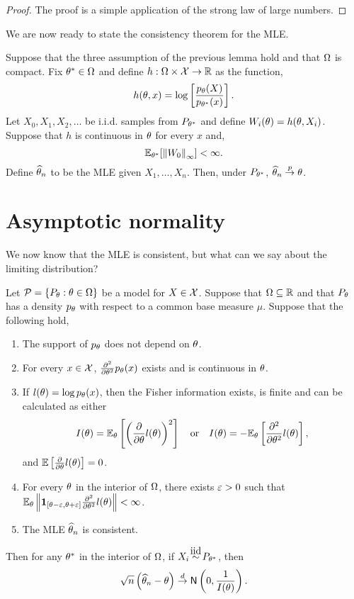 \begin{proof}
    The proof is a simple application of the strong law of large numbers.
\end{proof}
We are now ready to state the consistency theorem for the MLE. 
\begin{theorem}
    Suppose that the three assumption of the previous lemma hold and that ${{\Omega}}$ is compact. Fix ${\theta}^* \in {{\Omega}}$ and define $h:{{\Omega}} \times {\mathcal{X}} \to {\mathbb R}$ as the function,
    \[h({\theta},x) = \log\left[\frac{p_{\theta}(X)}{p_{{\theta}^*}(x)}\right]. \]
    Let $X_0,X_1,X_2,\ldots$ be i.i.d. samples from $P_{{\theta}^*}$ and define $W_i({\theta}) = h({\theta},X_i)$. Suppose that $h$ is continuous in ${\theta}$ for every $x$ and,
    \[{\mathbb{E}}_{{\theta}^*}[\left\|W_0\right\|_\infty] < \infty. \]
    Define $\widehat{{\theta}}_n$ to be the MLE given $X_1,\ldots,X_n$. Then, under $P_{{\theta}^*}$, $\widehat{{\theta}}_n \stackrel{p}{\to} {\theta}$.
\end{theorem}

\section{Asymptotic normality}
We now know that the MLE is consistent, but what can we say about the limiting distribution? 
\begin{theorem}
    Let ${\mathcal{P}} = \{P_{\theta}:{\theta} \in {{\Omega}}\}$ be a model for $X \in {\mathcal{X}}$. Suppose that ${{\Omega}} \subseteq {\mathbb R}$ and that $P_{\theta}$ has a density $p_{\theta}$ with respect to a common base measure $\mu$. Suppose that the following hold,
    \begin{enumerate}
        \item The support of $p_{\theta}$ does not depend on ${\theta}$.
        \item For every $x \in {\mathcal{X}}$, $\frac{\partial^2}{\partial {\theta}^2} p_{\theta}(x)$ exists and is continuous in ${\theta}$.
        \item If $l({\theta}) = \log p_{\theta}(x)$, then the Fisher information exists, is finite and can be calculated as either
        \[I({\theta}) = {\mathbb{E}}_{\theta}\left[\left(\frac{\partial}{\partial {\theta}}l({\theta})\right)^2\right]~~\text{ or }~~I({\theta}) = -{\mathbb{E}}_{\theta}\left[\frac{\partial^2}{\partial {\theta}^2}l({\theta})\right],\]
        and ${\mathbb{E}}\left[\frac{\partial}{\partial {\theta}}l({\theta})\right]=0$.
        \item For every ${\theta}$ in the interior of ${{\Omega}}$, there exists $\varepsilon > 0$ such that ${\mathbb{E}}_{\theta} \left\|{{\bf 1}}_{[{\theta}-\varepsilon,{\theta}+\varepsilon]}\frac{\partial^2}{\partial{\theta}^2}l({\theta})\right\|< \infty$.
        \item The MLE $\widehat{{\theta}}_n$ is consistent.
    \end{enumerate}
    Then for any ${\theta}^*$ in the interior of ${{\Omega}}$, if $X_i \iid P_{\ta^*}$, then 
    \[\sqrt{n}\left(\widehat{{\theta}}_n-{\theta}\right) \stackrel{d}{\to} \mathsf{N}\left(0, \frac{1}{I({\theta})}\right).\]
\end{theorem}
